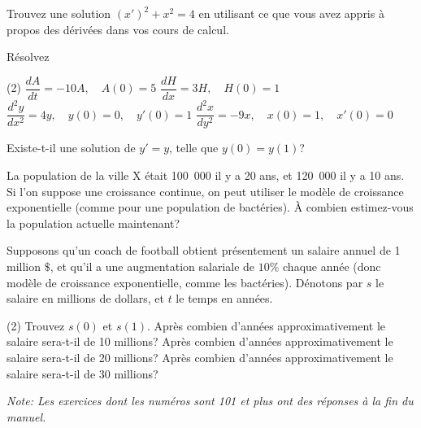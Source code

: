 \begin{exercise}
	Trouvez une solution
	${(x')}^2 + x^2 = 4$
	en utilisant ce que vous avez appris à propos des dérivées dans vos cours de calcul.
\end{exercise}

\begin{exercise}
	Résolvez
	\begin{tasks}(2)
		\task $\dfrac{dA}{dt} = -10 A, \quad A(0)=5$
		\task $\dfrac{dH}{dx} = 3 H, \quad H(0)=1$
		\task $\dfrac{d^2y}{dx^2} = 4 y, \quad y(0)=0, \quad y'(0)=1$
		\task $\dfrac{d^2x}{dy^2} = -9 x, \quad x(0)=1, \quad x'(0)=0$
	\end{tasks}
\end{exercise}

\begin{exercise}
	Existe-t-il une solution de $y' = y$, telle que $y(0) = y(1)$?
\end{exercise}

\begin{exercise}
	La population de la ville X était 100~000 il y a 20 ans, et 120~000 il y a 10 ans.  
	Si l'on suppose une croissance continue, on peut utiliser le modèle de croissance exponentielle
	(comme pour une population de bactéries). À combien estimez-vous la population actuelle maintenant?
\end{exercise}

\begin{exercise}
	Supposons qu'un coach de football obtient présentement un salaire annuel de 1 million $\$$,
	et qu'il a une augmentation salariale de $10\%$ chaque année (donc modèle de croissance exponentielle, comme les bactéries).
	Dénotons par $s$ le salaire en millions de dollars, et $t$ le temps en années.
	\begin{tasks}(2)
	\task Trouvez $s(0)$ et $s(1)$.
	\task Après combien d'années approximativement le salaire sera-t-il de 10 millions?
	\task Après combien d'années approximativement le salaire sera-t-il de 20 millions?
	\task Après combien d'années approximativement le salaire sera-t-il de 30 millions?
	\end{tasks}
\end{exercise}


\noindent
\emph{Note: Les exercices dont les numéros sont 101 et plus ont des réponses à la fin du manuel.}


\setcounter{exercise}{100}

